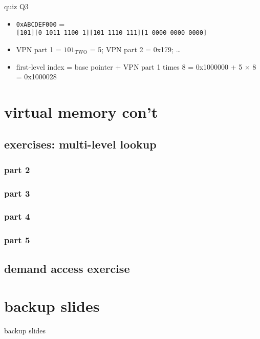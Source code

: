 \begin{frame}{quiz Q3}
    \begin{itemize}
    \item \texttt{0xABCDEF000} = \\
        {\small \tt [101][0 1011 1100 1][101 1110 111][1 0000 0000 0000]}
    \item VPN part 1 = $101_\text{TWO}$ = 5; VPN part 2 = 0x179; \ldots
    \item first-level index = base pointer + VPN part 1 times 8 = 0x1000000 + 5 $\times$ 8 = 0x1000028
    \end{itemize}
\end{frame}

\section{virtual memory con't}
\subsection{exercises: multi-level lookup}
\subsubsection{part 2}

\subsubsection{part 3}


\subsubsection{part 4}

\subsubsection{part 5}


\subsection{demand access exercise}





\section{backup slides}
\begin{frame}{backup slides}
\end{frame}




